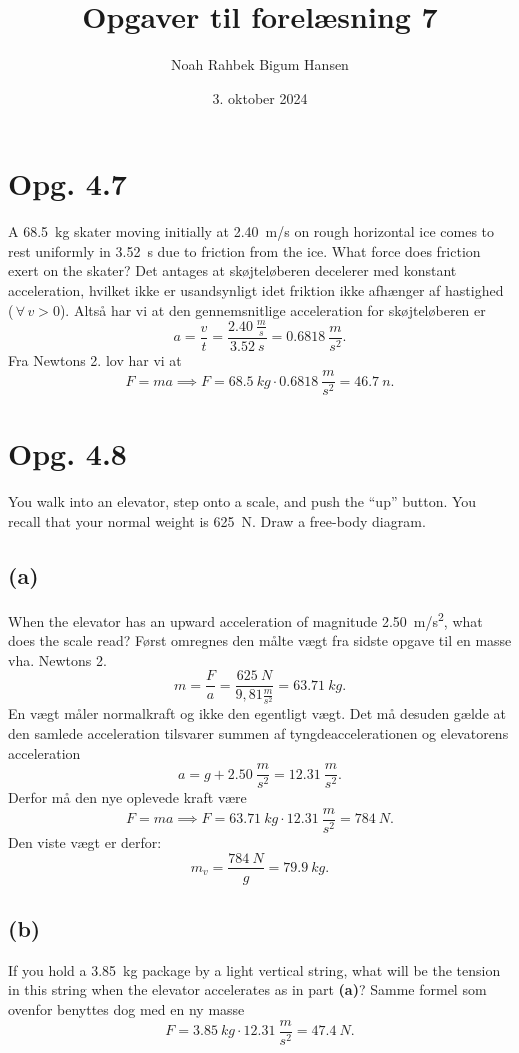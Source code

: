 \documentclass[12pt]{article}
\title{Opgaver til forelæsning 7}
\author{Noah Rahbek Bigum Hansen}
\date{3. oktober 2024}
\begin{document}
\section*{Opg. 4.7}
A \qty{68,5}{kg} skater moving initially at \qty{2,40}{m/s} on rough horizontal ice comes to rest uniformly in \qty{3,52}{s} due to friction from the ice.
What force does friction exert on the skater?
\bigbreak
Det antages at skøjteløberen decelerer med konstant acceleration, hvilket ikke er usandsynligt idet friktion ikke afhænger af hastighed ($ \, \forall \, v>0$). Altså har vi at den gennemsnitlige acceleration for skøjteløberen er
\[
  a = \frac{v}{t} = \frac{\qty{2,40}{\frac{m}{s}}}{\qty{3,52}{s}} = \qty{0,6818}{\frac{m}{s^2}}
.\] 
Fra Newtons 2. lov har vi at
\[
  F = ma \implies F = \qty{68,5}{kg}\cdot \qty{0,6818}{\frac{m}{s^2}} = \qty{46,7}{n}
.\] 

\section*{Opg. 4.8}
You walk into an elevator, step onto a scale, and push the “up” button. You recall that your normal weight is \qty{625}{N}. Draw a free-body diagram.

\subsection*{(a)}
When the elevator has an upward acceleration of magnitude \qty{2,50}{m/s^2}, what does the scale read?
\bigbreak
Først omregnes den målte vægt fra sidste opgave til en masse vha. Newtons 2.
\[
  m = \frac{F}{a} = \frac{\qty{625}{N}}{9,81 \frac{m}{s^2}} = \qty{63,71}{kg}
.\] 
En vægt måler normalkraft og ikke den egentligt vægt. Det må desuden gælde at den samlede acceleration tilsvarer summen af tyngdeaccelerationen og elevatorens acceleration
\[
a = g + \qty{2,50}{\frac{m}{s^2}} = \qty{12,31}{\frac{m}{s^2}}
.\] 
Derfor må den nye oplevede kraft være
\[
F = ma \implies F = \qty{63,71}{kg}\cdot \qty{12,31}{\frac{m}{s^2}} = \qty{784}{N}
.\] 
Den viste vægt er derfor:
\[
m_{v} = \frac{\qty{784}{N}}{g} = \qty{79,9}{kg}
.\] 

\subsection*{(b)}
If you hold a \qty{3,85}{kg} package by a light vertical string, what will be the tension in this string when the elevator accelerates as in part \textbf{(a)}?
\bigbreak
Samme formel som ovenfor benyttes dog med en ny masse
\[
F = \qty{3,85}{kg}\cdot \qty{12,31}{\frac{m}{s^2}} = \qty{47,4}{N}
.\] 
\end{document}
